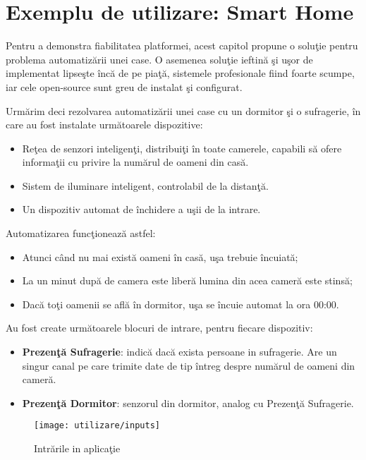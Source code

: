 \chapter{Exemplu de utilizare: Smart Home}
\label{chapter:studiuCaz}

Pentru a demonstra fiabilitatea platformei, acest capitol propune o soluţie pentru problema automatizării unei case. O asemenea soluţie ieftină şi uşor de implementat lipseşte încă de pe piaţă, sistemele profesionale fiind foarte scumpe, iar cele open-source sunt greu de instalat şi configurat.

Urmărim deci rezolvarea automatizării unei case cu un dormitor şi o sufragerie, în care au fost instalate următoarele dispozitive:
\begin{itemize}
	\item Reţea de senzori inteligenţi, distribuiţi în toate camerele, capabili să ofere informaţii cu privire la numărul de oameni din casă.
	\item Sistem de iluminare inteligent, controlabil de la distanţă.
	\item Un dispozitiv automat de închidere a uşii de la intrare.
\end{itemize}
Automatizarea funcţionează astfel:
\begin{itemize}
	\item Atunci când nu mai există oameni în casă, uşa trebuie încuiată;
	\item La un minut după de camera este liberă lumina din acea cameră este stinsă;
	\item Dacă toţi oamenii se află în dormitor, uşa se încuie automat la ora 00:00.
\end{itemize}

Au fost create următoarele blocuri de intrare, pentru fiecare dispozitiv:
\begin{itemize}
	\item \textbf{Prezenţă Sufragerie}: indică dacă exista persoane in sufragerie. Are un singur canal pe care trimite date de tip întreg despre numărul de oameni din cameră.
	\item \textbf{Prezenţă Dormitor}: senzorul din dormitor, analog cu Prezenţă Sufragerie.
\end{itemize}
\begin{figure}[H]
	\centering
	\texttt{[image: utilizare/inputs]}
	\captionsetup{justification=centering}
	\caption{Intrările in aplicaţie}
	\label{fig:inputs}
\end{figure}

